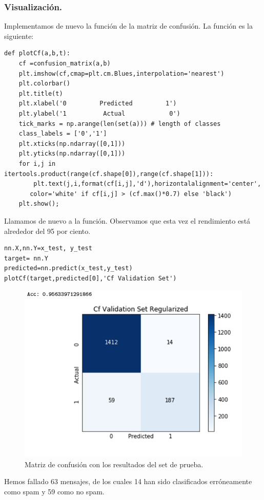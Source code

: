 \documentclass[a4paper,11pt]{article}
\begin{document}
\subsubsection{Visualización.}
Implementamos de nuevo la función de la matriz de confusión. La función es la siguiente:
\begin{lstlisting}
def plotCf(a,b,t):
    cf =confusion_matrix(a,b)
    plt.imshow(cf,cmap=plt.cm.Blues,interpolation='nearest')
    plt.colorbar()
    plt.title(t)
    plt.xlabel('0         Predicted         1')
    plt.ylabel('1          Actual            0')
    tick_marks = np.arange(len(set(a))) # length of classes
    class_labels = ['0','1']
    plt.xticks(np.ndarray([0,1]))
    plt.yticks(np.ndarray([0,1]))
    for i,j in itertools.product(range(cf.shape[0]),range(cf.shape[1])):
        plt.text(j,i,format(cf[i,j],'d'),horizontalalignment='center',    
	   color='white' if cf[i,j] > (cf.max()*0.7) else 'black')
    plt.show();
\end{lstlisting}
Llamamos de nuevo a la función. Observamos que esta vez el rendimiento está alrededor del 95 por ciento.
\begin{lstlisting}
nn.X,nn.Y=x_test, y_test 
target= nn.Y
predicted=nn.predict(x_test,y_test) 
plotCf(target,predicted[0],'Cf Validation Set')
\end{lstlisting}
\begin{figure}[H]
\centering
\includegraphics[scale=0.6]{Annotation 2020-03-23 161410}
\caption{Matriz de confusión con los resultados del set de prueba.}
\end{figure}
Hemos fallado 63 mensajes, de los cuales 14 han sido clasificados erróneamente como spam y 59 como no spam.
\end{document}
